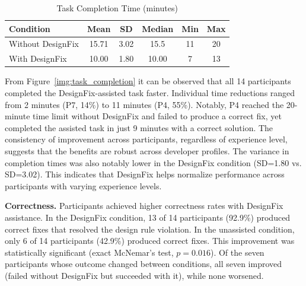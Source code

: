 \documentclass[conference]{IEEEtran}
\begin{document}
\begin{table}[t]
\caption{Task Completion Time (minutes)}
\label{tab:time}
\centering
\begin{tabular}{lccccc}
\toprule
\textbf{Condition} & \textbf{Mean} & \textbf{SD} & \textbf{Median} & \textbf{Min} & \textbf{Max} \\
\midrule
Without DesignFix & 15.71 & 3.02 & 15.5 & 11 & 20 \\
With DesignFix & 10.00 & 1.80 & 10.00 & 7 & 13 \\
\bottomrule
\end{tabular}
\end{table}

From Figure~\ref{img:task_completion} it can be observed that all 14 participants completed the DesignFix-assisted task faster. Individual time reductions ranged from 2 minutes (P7, 14\%) to 11 minutes (P4, 55\%). Notably, P4 reached the 20-minute time limit without DesignFix and failed to produce a correct fix, yet completed the assisted task in just 9 minutes with a correct solution. The consistency of improvement across participants, regardless of experience level, suggests that the benefits are robust across developer profiles.
The variance in completion times was also notably lower in the DesignFix condition (SD=1.80 vs. SD=3.02). This indicates that DesignFix helps normalize performance across participants with varying experience levels.

\textbf{Correctness.} Participants achieved higher correctness rates with DesignFix assistance. In the DesignFix condition, 13 of 14 participants (92.9\%) produced correct fixes that resolved the design rule violation. In the unassisted condition, only 6 of 14 participants (42.9\%) produced correct fixes. This improvement was statistically significant (exact McNemar's test, $p = 0.016$). Of the seven participants whose outcome changed between conditions, all seven improved (failed without DesignFix but succeeded with it), while none worsened.

\end{document}
